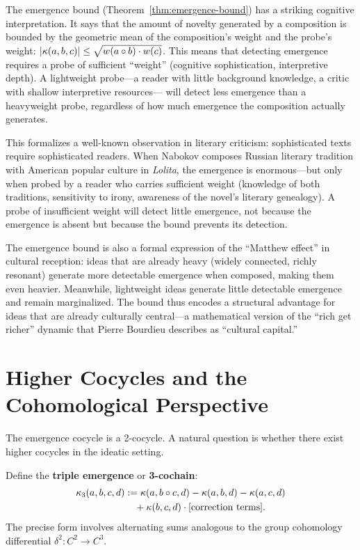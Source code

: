 \begin{interpretation}\label{interp:ch2:emergence_bound_cognitive}
The emergence bound (Theorem~\ref{thm:emergence-bound}) has a striking
cognitive interpretation. It says that the amount of novelty generated
by a composition is bounded by the geometric mean of the composition's
weight and the probe's weight: $|\kappa(a, b, c)| \leq
\sqrt{w(a \circ b) \cdot w(c)}$. This means that detecting emergence
requires a probe of sufficient ``weight'' (cognitive sophistication,
interpretive depth). A lightweight probe---a reader with little
background knowledge, a critic with shallow interpretive resources---
will detect less emergence than a heavyweight probe, regardless of
how much emergence the composition actually generates.

This formalizes a well-known observation in literary criticism:
sophisticated texts require sophisticated readers. When Nabokov
composes Russian literary tradition with American popular culture in
\emph{Lolita}, the emergence is enormous---but only when probed by
a reader who carries sufficient weight (knowledge of both traditions,
sensitivity to irony, awareness of the novel's literary genealogy).
A probe of insufficient weight will detect little emergence, not
because the emergence is absent but because the bound prevents its
detection.

The emergence bound is also a formal expression of the ``Matthew
effect'' in cultural reception: ideas that are already heavy (widely
connected, richly resonant) generate more detectable emergence when
composed, making them even heavier. Meanwhile, lightweight ideas
generate little detectable emergence and remain marginalized. The
bound thus encodes a structural advantage for ideas that are already
culturally central---a mathematical version of the ``rich get richer''
dynamic that Pierre Bourdieu describes as ``cultural capital.''
\end{interpretation}

\section{Higher Cocycles and the Cohomological Perspective}

The emergence cocycle is a 2-cocycle. A natural question is whether there
exist higher cocycles in the ideatic setting.

\begin{definition}
Define the \textbf{triple emergence} or \textbf{3-cochain}:
\begin{align*}
    \kappa_3(a,b,c,d) &:= \kappa(a, b \circ c, d)
      - \kappa(a,b,d) - \kappa(a,c,d) \\
    &\quad + \kappa(b,c,d) \cdot [\text{correction terms}].
\end{align*}
The precise form involves alternating sums analogous to the group
cohomology differential $\delta^2 : C^2 \to C^3$.
\end{definition}

